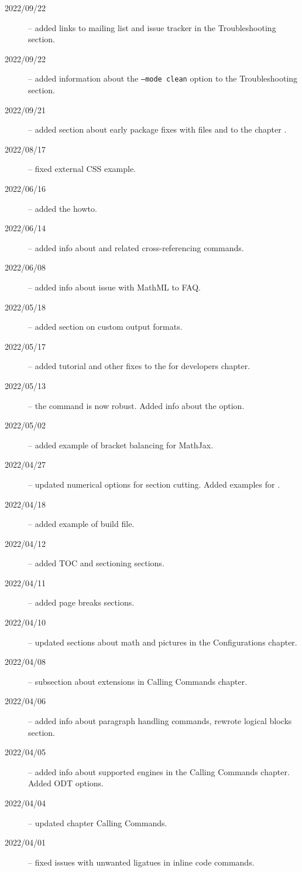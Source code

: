 \begin{description}
  \item[2022/09/22] -- added links to mailing list and issue tracker in the Troubleshooting section.
  \item[2022/09/22] -- added information about the \texttt{--mode clean} option to the Troubleshooting section.
  \item[2022/09/21] -- added section about early package fixes with  files and  to the chapter .
  \item[2022/08/17] -- fixed external CSS example.
  \item[2022/06/16] -- added the  howto.
  \item[2022/06/14] -- added info about  and related cross-referencing commands.
  \item[2022/06/08] -- added info about  issue with MathML to FAQ.
  \item[2022/05/18] -- added section on custom output formats.
  \item[2022/05/17] -- added tutorial and other fixes to the for developers chapter.
  \item[2022/05/13] -- the  command is now robust. Added info about the  option.
  \item[2022/05/02] -- added example of bracket balancing for MathJax.
  \item[2022/04/27] -- updated numerical options for section cutting. Added examples for .
  \item[2022/04/18] -- added example of \makefourht{} build file.
  \item[2022/04/12] -- added TOC and sectioning sections.
  \item[2022/04/11] -- added page breaks sections.
  \item[2022/04/10] -- updated sections about math and pictures in the Configurations chapter.
  \item[2022/04/08] -- subsection about \makefourht{} extensions in Calling Commands chapter.
  \item[2022/04/06] -- added info about paragraph handling commands, rewrote logical blocks section.
  \item[2022/04/05] -- added info about supported engines in the Calling Commands chapter. Added ODT options.
  \item[2022/04/04] -- updated chapter Calling Commands.
  \item[2022/04/01] -- fixed issues with unwanted ligatues in inline code commands.

\end{description}
